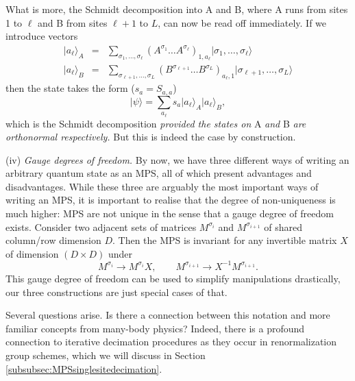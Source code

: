 \documentclass[a4paper,10pt,oneside,onecolumn,1p,times]{elsarticle}
\newcommand{\ket}[1]{\mbox{$| #1  \rangle$}}
\begin{document}
What is more, the Schmidt decomposition into A and B, where A runs from sites 1 to $\ell$ and B from sites $\ell+1$ to $L$, can now be read off immediately. If we introduce vectors
\begin{eqnarray}
\ket{a_\ell}_A &=& \sum_{\sigma_1,\ldots,\sigma_\ell}
(A^{\sigma_1} \ldots A^{\sigma_\ell})_{1,a_\ell}
 \ket{\sigma_1,\ldots,\sigma_\ell} \\
\ket{a_\ell}_B &=&  \sum_{\sigma_{\ell+1},\ldots,\sigma_L} 
(B^{\sigma_{\ell+1}} \ldots B^{\sigma_L})_{a_\ell,1}
\ket{\sigma_{\ell+1},\ldots,\sigma_L}
\end{eqnarray}
then the state takes the form ($s_a = S_{a,a}$)
\begin{equation}
\ket{\psi} = \sum_{a_\ell} s_a \ket{a_\ell}_A \ket{a_\ell}_B ,
\end{equation}
which is the Schmidt decomposition {\em provided the states on} A {\em and} B {\em are orthonormal respectively.} But this is indeed the case by construction.

(iv) {\em Gauge degrees of freedom.} By now, we have three different ways of writing an arbitrary quantum state as an MPS, all of which present advantages and disadvantages. While these three are arguably the most important ways of writing an MPS, it is important to realise that the degree of non-uniqueness is much higher: MPS are not unique  in the sense that a gauge degree of freedom exists. Consider two adjacent sets of matrices $M^{\sigma_i}$ and $M^{\sigma_{i+1}}$ of shared column/row dimension $D$. Then the MPS is invariant for any invertible matrix $X$ of dimension $(D\times D)$ under
\begin{equation}
M^{\sigma_i} \rightarrow M^{\sigma_i} X, \quad \quad M^{\sigma_{i+1}} \rightarrow X^{-1}M^{\sigma_{i+1}} .
\end{equation}
This gauge degree of freedom can be used to simplify manipulations drastically, our three constructions are just special cases of that.
 
Several questions arise. Is there a connection between this notation and more familiar concepts from many-body physics? Indeed, there is a profound connection to iterative decimation procedures as they occur in renormalization group schemes, which we will discuss in Section \ref{subsubsec:MPSsinglesitedecimation}. 
\end{document}
